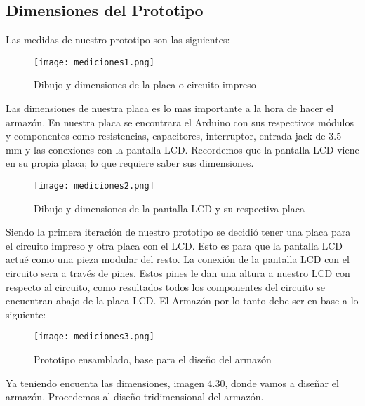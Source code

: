 \subsection{Dimensiones del Prototipo}

\par 
Las medidas de nuestro prototipo son las siguientes:

\begin{figure}[H]
	\centering
	\texttt{[image: mediciones1.png]}
	\caption{Dibujo y dimensiones de la placa o circuito impreso}
\end{figure}

\par \noindent
Las dimensiones de nuestra placa es lo mas importante a la hora de hacer el armazón. En nuestra placa se encontrara el Arduino con sus respectivos módulos y componentes como resistencias, capacitores, interruptor, entrada jack de 3.5 mm y las conexiones con la pantalla LCD. Recordemos que la pantalla LCD viene en su propia placa; lo que requiere saber sus dimensiones.

\begin{figure}[H]
	\centering
	\texttt{[image: mediciones2.png]}
	\caption{Dibujo y dimensiones de la pantalla LCD y su respectiva placa}
\end{figure}

\par \noindent
Siendo la primera iteración de nuestro prototipo se decidió tener una placa para el circuito impreso y otra placa con el LCD. Esto es para que la pantalla LCD actué como una pieza modular del resto. La conexión de la pantalla LCD con el circuito sera a través de pines. Estos pines le dan una altura a nuestro LCD con respecto al circuito, como resultados todos los componentes del circuito se encuentran abajo de la placa LCD. El Armazón por lo tanto debe ser en base a lo siguiente:

\begin{figure}[H]
	\centering
	\texttt{[image: mediciones3.png]}
	\caption{Prototipo ensamblado, base para el diseño del armazón}
\end{figure}

\par \noindent
Ya teniendo encuenta las dimensiones, imagen 4.30, donde vamos a diseñar el armazón. Procedemos al diseño tridimensional del armazón.

